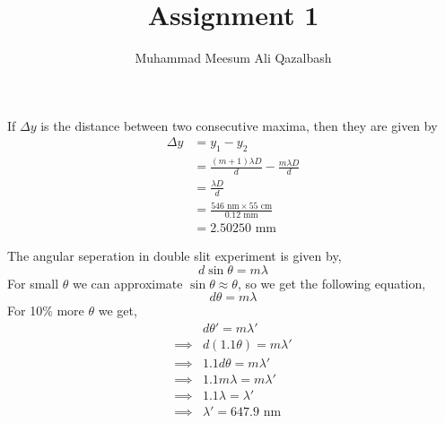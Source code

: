 \documentclass{article}
\title{Assignment 1}
\author{Muhammad Meesum Ali Qazalbash}
\theoremstyle{mytheoremstyle}
\theoremstyle{mytheoremstyle}
\theoremstyle{myproblemstyle}
\begin{document}
\maketitle

\begin{problem}
If \(\Delta y\) is the distance between two consecutive maxima, then they are given by
\begin{align*}
	\Delta y & = y_1 - y_2                                                \\
	         & = \frac{(m+1)\lambda D}{d} - \frac{m\lambda D}{d}          \\
	         & = \frac{\lambda D}{d}                                      \\
	         & = \frac{546 \text{ nm}\times 55\text{ cm}}{0.12\text{ mm}} \\
	         & = 2.50250 \text{ mm}
\end{align*}

\end{problem}

\begin{problem}
The angular seperation in double slit experiment is given by,
\[d\sin{\theta}=m\lambda\]
For small \(\theta\) we can approximate \(\sin{\theta}\approx\theta\), so we get the following equation,
\[d\theta=m\lambda\]
For 10\% more \(\theta\) we get,
\begin{align*}
	         & d\theta'=m\lambda'        \\
	\implies & d(1.1\theta)=m\lambda'    \\
	\implies & 1.1d\theta=m\lambda'      \\
	\implies & 1.1m\lambda=m\lambda'     \\
	\implies & 1.1\lambda=\lambda'       \\
	\implies & \lambda'= 647.9\text{ nm}
\end{align*}

\end{problem}

\newpage
\end{document}
